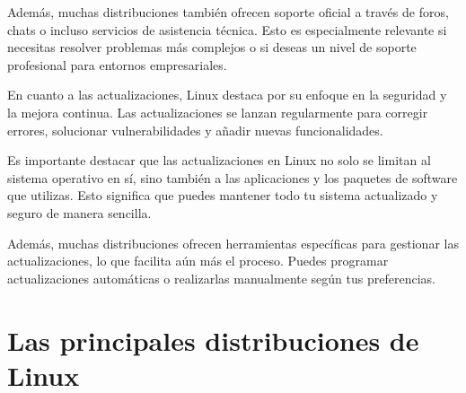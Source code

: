 \documentclass[
  jou,
  floatsintext,
  longtable,
  a4paper,
  nolmodern,
  notxfonts,
  notimes,
  12pt,
  colorlinks=true,linkcolor=blue,citecolor=blue,urlcolor=blue]{apa7}
\begin{document}
Además, muchas distribuciones también ofrecen soporte oficial a través
de foros, chats o incluso servicios de asistencia técnica. Esto es
especialmente relevante si necesitas resolver problemas más complejos o
si deseas un nivel de soporte profesional para entornos empresariales.

En cuanto a las actualizaciones, Linux destaca por su enfoque en la
seguridad y la mejora continua. Las actualizaciones se lanzan
regularmente para corregir errores, solucionar vulnerabilidades y añadir
nuevas funcionalidades.

Es importante destacar que las actualizaciones en Linux no solo se
limitan al sistema operativo en sí, sino también a las aplicaciones y
los paquetes de software que utilizas. Esto significa que puedes
mantener todo tu sistema actualizado y seguro de manera sencilla.

Además, muchas distribuciones ofrecen herramientas específicas para
gestionar las actualizaciones, lo que facilita aún más el proceso.
Puedes programar actualizaciones automáticas o realizarlas manualmente
según tus preferencias.

\section{Las principales distribuciones de
Linux}\label{las-principales-distribuciones-de-linux}
\end{document}
